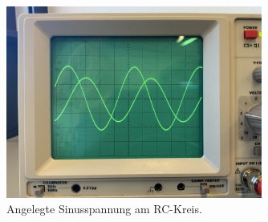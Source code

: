 \begin{figure}[H]
    \centering
    \includegraphics[width=0.75\textwidth]{Dateien/d.1.jpeg}
    \caption{Angelegte Sinusspannung am RC-Kreis.}
    \label{fig:d.1}
\end{figure}